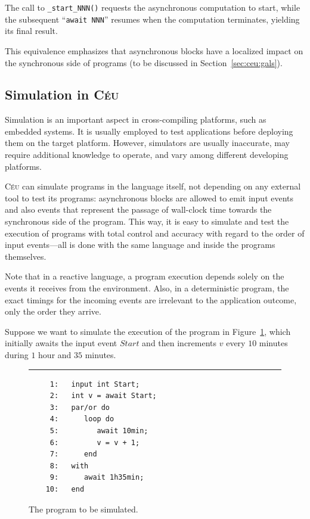 \documentclass[11pt,a4paper]{article}
\newcommand{\2}{\;\;}
\newcommand{\5}{\;\;\;\;\;}
\newcommand{\CEU}{\textsc{C\'{e}u}}
\newcommand{\code}[1] {{\small{\texttt{#1}}}}
\begin{document}
The call to \code{\_start\_NNN()} requests the asynchronous computation to 
start, while the subsequent ``\code{await NNN}'' resumes when the computation 
terminates, yielding its final result.

This equivalence emphasizes that asynchronous blocks have a localized impact on 
the synchronous side of programs (to be discussed in 
Section~\ref{sec:ceu:gals}).

\subsection{Simulation in \CEU}
\label{sec:ceu:simul}

Simulation is an important aspect in cross-compiling platforms, such as 
embedded systems.
It is usually employed to test applications before deploying them on the target 
platform.
However, simulators are usually inaccurate, may require additional knowledge to 
operate, and vary among different developing platforms.

\CEU{} can simulate programs in the language itself, not depending on any 
external tool to test its programs: asynchronous blocks are allowed to emit 
input events and also events that represent the passage of wall-clock time 
towards the synchronous side of the program.
This way, it is easy to simulate and test the execution of programs with total 
control and accuracy with regard to the order of input events---all is done 
with the same language and inside the programs themselves.

Note that in a reactive language, a program execution depends solely on the 
events it receives from the environment.
Also, in a deterministic program, the exact timings for the incoming events are 
irrelevant to the application outcome, only the order they arrive.

Suppose we want to simulate the execution of the program in 
Figure~\ref{lst:ceu:simul:1}, which initially awaits the input event $Start$ 
and then increments $v$ every $10$ minutes during $1$ hour and $35$ minutes.

\begin{figure}[h]
\rule{15cm}{0.37pt}
{\small
\begin{verbatim}
     1:   input int Start;
     2:   int v = await Start;
     3:   par/or do
     4:      loop do
     5:         await 10min;
     6:         v = v + 1;
     7:      end
     8:   with
     9:      await 1h35min;
    10:   end
\end{verbatim}
}
\caption{ The program to be simulated.
\label{lst:ceu:simul:1}
}
\end{figure}
\end{document}
